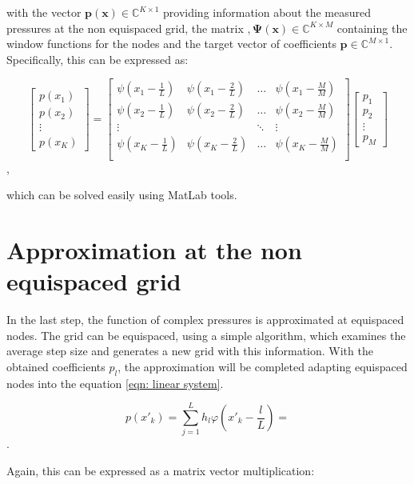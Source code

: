 \documentclass[11pt]{report} %
\begin{document}
with the  vector $\bm{p(x)} \in \mathbb{C}^{K \times 1}$ providing information about the measured pressures at the non equispaced grid, the matrix $,\bm{\Psi (x)} \in \mathbb{C}^{K \times M}$ containing the window functions for the nodes  and the target vector of coefficients $\bm{p} \in \mathbb{C}^{M \times 1}$.
Specifically, this can be expressed as: 

\[
\begin{bmatrix}
	p(x_1) \\
	p(x_2) \\
	\vdots\\
	p(x_K)
\end{bmatrix} = 
\begin{bmatrix}
    \psi(x_{1}-\frac{1}{L})& \psi(x_{1}-\frac{2}{L})& \dots & \psi(x_{1}-\frac{M}{M}) \\
    \psi(x_{2}-\frac{1}{L})& \psi(x_{2}-\frac{2}{L})& \dots & \psi(x_{2}-\frac{M}{M}) \\
    \vdots &  &\ddots & \vdots \\
    \psi(x_{K}-\frac{1}{L})& \psi(x_{K}-\frac{2}{L})& \dots & \psi(x_{K}-\frac{M}{M}) \\   
\end{bmatrix}
\begin{bmatrix}
    p_1 \\
    p_2 \\
    \vdots \\
    p_{M}
\end{bmatrix}
\],

which can be solved easily using MatLab tools.

\section{Approximation at the non equispaced grid}
In the last step, the function of complex pressures is approximated at equispaced nodes. The grid can be equispaced, using a simple algorithm, which examines the average step size and generates a new grid with this information.
With the obtained coefficients $p_l$, the approximation will be completed adapting equispaced nodes into the equation \eqref{eqn: linear system}. 

\begin{equation}
 p(x'_{k})=\sum\limits_{j=1}^L h_{l}\varphi(x'_{k}-\frac{l}{L})=
\end{equation}. 

Again, this can be expressed as a matrix vector multiplication: 
\end{document}
